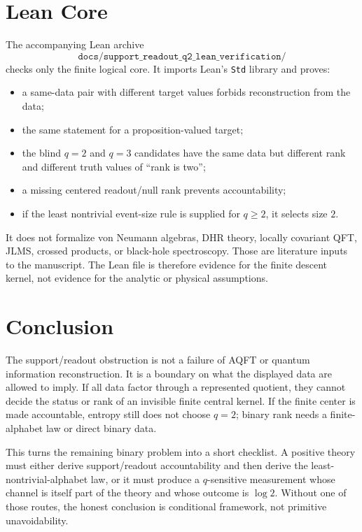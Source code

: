 \documentclass[12pt]{article}
\theoremstyle{definition}
\theoremstyle{remark}
\begin{document}
\section{Lean Core}

The accompanying Lean archive
\[
  \texttt{docs/support\_readout\_q2\_lean\_verification/}
\]
checks only the finite logical core.  It imports Lean's \texttt{Std} library
and proves:
\begin{itemize}
  \item a same-data pair with different target values forbids reconstruction
  from the data;
  \item the same statement for a proposition-valued target;
  \item the blind \(q=2\) and \(q=3\) candidates have the same data but
  different rank and different truth values of ``rank is two'';
  \item a missing centered readout/null rank prevents accountability;
  \item if the least nontrivial event-size rule is supplied for \(q\ge2\), it
  selects size \(2\).
\end{itemize}
It does not formalize von Neumann algebras, DHR theory, locally covariant QFT,
JLMS, crossed products, or black-hole spectroscopy.  Those are literature
inputs to the manuscript.  The Lean file is therefore evidence for the finite
descent kernel, not evidence for the analytic or physical assumptions.

\section{Conclusion}

The support/readout obstruction is not a failure of AQFT or quantum
information reconstruction.  It is a boundary on what the displayed data are
allowed to imply.  If all data factor through a represented quotient, they
cannot decide the status or rank of an invisible finite central kernel.  If the
finite center is made accountable, entropy still does not choose \(q=2\);
binary rank needs a finite-alphabet law or direct binary data.

This turns the remaining binary problem into a short checklist.  A positive
theory must either derive support/readout accountability and then derive the
least-nontrivial-alphabet law, or it must produce a \(q\)-sensitive measurement
whose channel is itself part of the theory and whose outcome is \(\log2\).
Without one of those routes, the honest conclusion is conditional framework,
not primitive unavoidability.
\end{document}
